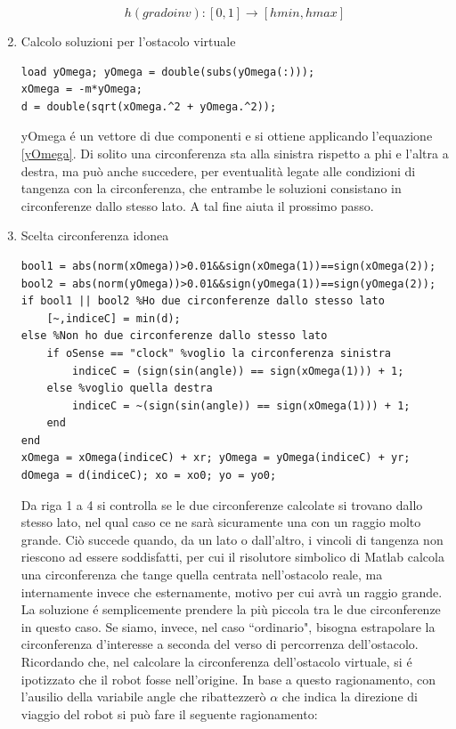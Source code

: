 \documentclass[14pt,a4paper]{extarticle}
\begin{document}
\begin{enumerate}
\[h(gradoinv): [0,1] \rightarrow [hmin,hmax]\]
\item Calcolo soluzioni per l'ostacolo virtuale
\begin{lstlisting}[caption=Istruzioni per calcolare \(x_{\Omega}\) e \(y_{\Omega}\)]
load yOmega; yOmega = double(subs(yOmega(:)));
xOmega = -m*yOmega;
d = double(sqrt(xOmega.^2 + yOmega.^2));
\end{lstlisting}
yOmega é un vettore di due componenti e si ottiene applicando l'equazione \ref{yOmega}. Di solito una circonferenza sta alla sinistra rispetto a phi e l'altra a destra, ma può anche succedere, per eventualità legate alle condizioni di tangenza con la circonferenza, che entrambe le soluzioni consistano in circonferenze dallo stesso lato. A tal fine aiuta il prossimo passo.
\item Scelta circonferenza idonea
\begin{lstlisting}[caption=Istruzioni per scegliere la circonferenza idonea]
bool1 = abs(norm(xOmega))>0.01&&sign(xOmega(1))==sign(xOmega(2));
bool2 = abs(norm(yOmega))>0.01&&sign(yOmega(1))==sign(yOmega(2));
if bool1 || bool2 %Ho due circonferenze dallo stesso lato
	[~,indiceC] = min(d);
else %Non ho due circonferenze dallo stesso lato
	if oSense == "clock" %voglio la circonferenza sinistra
		indiceC = (sign(sin(angle)) == sign(xOmega(1))) + 1;
	else %voglio quella destra
		indiceC = ~(sign(sin(angle)) == sign(xOmega(1))) + 1;
	end
end
xOmega = xOmega(indiceC) + xr; yOmega = yOmega(indiceC) + yr;
dOmega = d(indiceC); xo = xo0; yo = yo0;
\end{lstlisting}
Da riga 1 a 4 si controlla se le due circonferenze calcolate si trovano dallo stesso lato, nel qual caso ce ne sarà sicuramente una con un raggio molto grande. Ciò succede quando, da un lato o dall'altro, i vincoli di tangenza non riescono ad essere soddisfatti, per cui il risolutore simbolico di Matlab calcola una circonferenza che tange quella centrata nell'ostacolo reale, ma internamente invece che esternamente, motivo per cui avrà un raggio grande. La soluzione é semplicemente prendere la più piccola tra le due circonferenze in questo caso. Se siamo, invece, nel caso ``ordinario", bisogna estrapolare la circonferenza d'interesse a seconda del verso di percorrenza dell'ostacolo. Ricordando che, nel calcolare la circonferenza dell'ostacolo virtuale, si é ipotizzato che il robot fosse nell'origine. In base a questo ragionamento, con l'ausilio della variabile angle che ribattezzerò \(\alpha\) che indica la direzione di viaggio del robot si può fare il seguente ragionamento: 

\end{enumerate}
\end{document}
